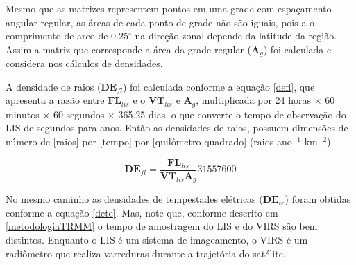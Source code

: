Mesmo que as matrizes representem pontos em uma grade com espaçamento angular regular, as áreas de cada ponto de grade não são iguais, pois a  o comprimento de arco de 0.25$^{\circ}$ na direção zonal depende da latitude da região. Assim a matriz que corresponde a área da grade regular ($\mathbf{A}_g$) foi calculada e considera nos cálculos de densidades.


A densidade de raios ($\mathbf{DE}_{fl}$) foi calculada conforme a equação \ref{defl}, que apresenta a razão entre $\mathbf{FL}_{lis}$ e o $\mathbf{VT}_{lis}$ e $\mathbf{A}_g$, multiplicada por 24 horas $\times$ 60 minutos $\times$ 60 segundos $\times$ 365.25 dias, o que converte o tempo de observação do LIS de segundos para anos. Então as densidades de raios, possuem dimensões de número de [raios] por [tempo] por [quilômetro quadrado] (raios ano$^{-1}$ km$^{-2}$).

\begin{equation}
\mathbf{DE}_{fl} = \frac{\mathbf{FL}_{lis}}{\mathbf{VT}_{lis} \mathbf{A}_g} 31557600     
\label{defl}
\end{equation}

No mesmo caminho as densidades de tempestades elétricas ($\mathbf{DE}_{te}$) foram obtidas conforme a equação \ref{dete}. Mas, note que, conforme descrito em \ref{metodologiaTRMM} o tempo de amostragem do LIS e do VIRS são bem distintos. Enquanto o LIS é um sistema de imageamento, o VIRS é um radiômetro que realiza varreduras durante a trajetória do satélite. 


